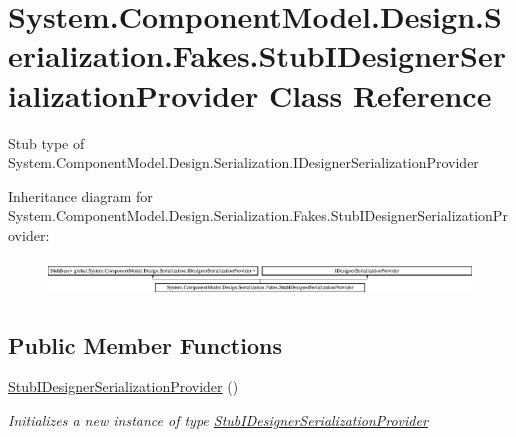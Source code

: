 \hypertarget{class_system_1_1_component_model_1_1_design_1_1_serialization_1_1_fakes_1_1_stub_i_designer_serialization_provider}{\section{System.\-Component\-Model.\-Design.\-Serialization.\-Fakes.\-Stub\-I\-Designer\-Serialization\-Provider Class Reference}
\label{class_system_1_1_component_model_1_1_design_1_1_serialization_1_1_fakes_1_1_stub_i_designer_serialization_provider}
}


Stub type of System.\-Component\-Model.\-Design.\-Serialization.\-I\-Designer\-Serialization\-Provider 


Inheritance diagram for System.\-Component\-Model.\-Design.\-Serialization.\-Fakes.\-Stub\-I\-Designer\-Serialization\-Provider\-:\begin{figure}[H]
\begin{center}
\leavevmode
\includegraphics[height=0.984183cm]{class_system_1_1_component_model_1_1_design_1_1_serialization_1_1_fakes_1_1_stub_i_designer_serialization_provider}
\end{center}
\end{figure}
\subsection*{Public Member Functions}
\begin{DoxyCompactItemize}
\item 
\hyperlink{class_system_1_1_component_model_1_1_design_1_1_serialization_1_1_fakes_1_1_stub_i_designer_serialization_provider_a20dc2c83aac77307c390af9e4d05316e}{Stub\-I\-Designer\-Serialization\-Provider} ()
\begin{DoxyCompactList}\small\item\em Initializes a new instance of type \hyperlink{class_system_1_1_component_model_1_1_design_1_1_serialization_1_1_fakes_1_1_stub_i_designer_serialization_provider}{Stub\-I\-Designer\-Serialization\-Provider}\end{DoxyCompactList}\end{DoxyCompactItemize}
